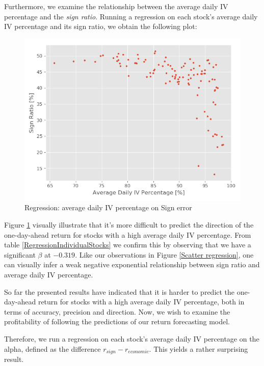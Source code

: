Furthermore, we examine the relationship between the average daily IV percentage and the \textit{sign ratio}. Running a regression on each stock's average daily IV percentage and its sign ratio, we obtain the following plot: 

\begin{figure}[h]
    \centering
    \includegraphics[scale = 0.5]{Plot/IndividualStockRegression1.png}
    \caption{Regression: average daily IV percentage on Sign error}
    \label{IVSignError}
\end{figure}

Figure \ref{IVSignError} visually illustrate that it's more difficult to predict the direction of the one-day-ahead return for stocks with a high average daily IV percentage. From table \ref{RegressionIndividualStocks} we confirm this by observing that we have a significant $\beta$ at $-0.319$. Like our observations in Figure \ref{Scatter regression}, one can visually infer a weak negative exponential relationship between sign ratio and average daily IV percentage.

So far the presented results have indicated that it is harder to predict the one-day-ahead return for stocks with a high average daily IV percentage, both in terms of accuracy, precision and direction. Now, we wish to examine the profitability of following the predictions of our return forecasting model. 

Therefore, we run a regression on each stock’s average daily IV percentage on the alpha, defined as the difference $r_{sign}-r_{economic}$. This yields a rather surprising result.

